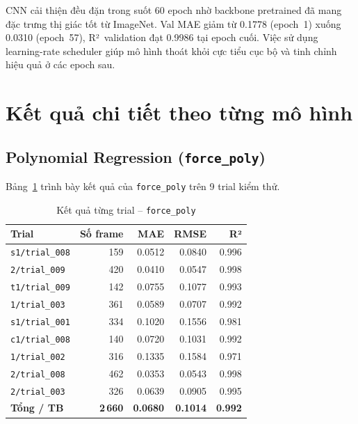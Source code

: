 CNN cải thiện đều đặn trong suốt 60 epoch nhờ backbone pretrained đã mang
đặc trưng thị giác tốt từ ImageNet. Val MAE giảm từ 0.1778 (epoch~1) xuống
0.0310 (epoch~57), R²~validation đạt 0.9986 tại epoch cuối. Việc sử dụng
learning-rate scheduler giúp mô hình thoát khỏi cực tiểu cục bộ và tinh
chỉnh hiệu quả ở các epoch sau.

\section{Kết quả chi tiết theo từng mô hình}
\label{sec:per_model_results}

\subsection{Polynomial Regression (\texttt{force\_poly})}

Bảng~\ref{tab:poly_trial} trình bày kết quả của \texttt{force\_poly} trên 9
trial kiểm thử.

\begin{table}[h]
\centering
\caption{Kết quả từng trial -- \texttt{force\_poly}}
\label{tab:poly_trial}
\begin{tabular}{lrrrr}
\toprule
\textbf{Trial} & \textbf{Số frame} & \textbf{MAE} & \textbf{RMSE} & \textbf{R²} \\
\midrule
\texttt{s1/trial\_008} & 159 & 0.0512 & 0.0840 & 0.996 \\
\texttt{2/trial\_009}  & 420 & 0.0410 & 0.0547 & 0.998 \\
\texttt{t1/trial\_009} & 142 & 0.0755 & 0.1077 & 0.993 \\
\texttt{1/trial\_003}  & 361 & 0.0589 & 0.0707 & 0.992 \\
\texttt{s1/trial\_001} & 334 & 0.1020 & 0.1556 & 0.981 \\
\texttt{c1/trial\_008} & 140 & 0.0720 & 0.1031 & 0.992 \\
\texttt{1/trial\_002}  & 316 & 0.1335 & 0.1584 & 0.971 \\
\texttt{2/trial\_008}  & 462 & 0.0353 & 0.0543 & 0.998 \\
\texttt{2/trial\_003}  & 326 & 0.0639 & 0.0905 & 0.995 \\
\midrule
\textbf{Tổng / TB} & \textbf{2\,660} & \textbf{0.0680} & \textbf{0.1014} & \textbf{0.992} \\
\bottomrule
\end{tabular}
\end{table}

